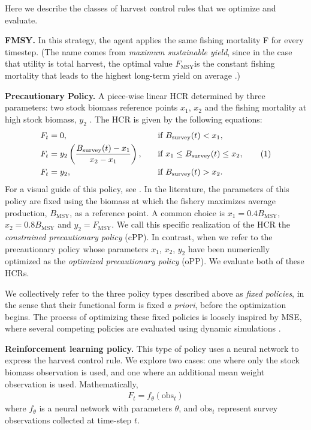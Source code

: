 \documentclass[floatfix,nofootinbib,longbibliography,notitlepage]{revtex4-1}
\newcommand\numberthis{\addtocounter{equation}{1}\tag{\theequation}}
\def\textfmsy{$F_{\text{MSY}}$}
\def\fmsy{F_{\text{MSY}}}
\def\bmsy{B_{\text{MSY}}}
\def\bsurv{B_{\text{survey}}}
\def\obs{\text{obs}}
\begin{document}
Here we describe the classes of harvest control rules that we optimize and evaluate.

\textbf{FMSY.} 
In this strategy, the agent applies the same fishing mortality F for every timestep. 
(The name comes from \emph{maximum sustainable yield}, since in the case that utility is total harvest, the optimal value \textfmsy is the constant fishing mortality that leads to the highest long-term yield on average \cite{hilborn-walters-1992}.)

\textbf{Precautionary Policy.}
A piece-wise linear HCR determined by three parameters: 
two stock biomass reference points $x_1$, $x_2$  and the fishing mortality at high stock biomass,  $y_2$ . 
The HCR is given by the following equations:
\begin{alignat*}{2}
    F_t &= 0, \quad && \text{if } \bsurv(t) < x_1,\\
    F_t &= y_2 \left(\frac{\bsurv(t) - x_1}{x_2 - x_1}\right), \quad && \text{if } x_1 \leq \bsurv(t) \leq x_2, \numberthis\\
    F_t &= y_2, \quad && \text{if } \bsurv(t) > x_2.
\end{alignat*}
For a visual guide of this policy, see \cite[Fig.~1]{dfo2006}. 
In the literature, the parameters of this policy are fixed using the biomass at which the fishery maximizes average production, $\bmsy$, as a reference point. 
A common choice is $x_1=0.4 \bmsy$, $x_2=0.8 \bmsy$ and $y_2=\fmsy$. 
We call this specific realization of the HCR the \emph{constrained precautionary policy} (cPP). 
In contrast, when we refer to the precautionary policy whose parameters $x_1$, $x_2$, $y_2$ have been numerically optimized as the \emph{optimized precautionary policy} (oPP). 
We evaluate both of these HCRs.

We collectively refer to the three policy types described above as \emph{fixed policies}, in the sense that their functional form is fixed \emph{a priori}, before the optimization begins. 
The process of optimizing these fixed policies is loosely inspired by MSE, where several competing policies are evaluated using dynamic simulations \cite{punt-mse}.

\textbf{Reinforcement learning policy.} 
This type of policy uses a neural network to express the harvest control rule. 
We explore two cases: one where only the stock biomass observation is used, and one where an additional mean weight observation is used. 
Mathematically,
\begin{align}
    F_t = f_\theta(\obs_t)
\end{align}
where $f_\theta$ is a neural network with parameters $\theta$, and $\obs_t$ represent survey observations collected at time-step $t$. 
\end{document}

